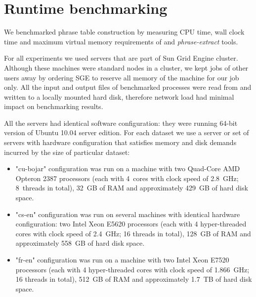 \section{Runtime benchmarking}

We benchmarked phrase table construction by measuring CPU time, wall clock time
and maximum virtual memory requirements of \eppex{} and \emph{phrase-extract} tools.

For all experiments we used servers that are part of Sun Grid Engine cluster.
Although these machines were standard nodes in a cluster, we kept jobs of other
users away by ordering SGE to reserve all memory of the machine for our job only.
All the input and output files of benchmarked processes were read from and written
to a locally mounted hard disk, therefore network load had minimal impact on
benchmarking results.

All the servers had identical software configuration:
they were running 64-bit version of Ubuntu 10.04 server edition.
For each dataset we use a server or set of servers with hardware configuration
that satisfies memory and disk demands incurred by the size of particular dataset:
\begin{itemize}
  \item "cu-bojar" configuration was run on a machine with two Quad-Core
  AMD Opteron\texttrademark{} 2387 processors (each with 4~cores with clock speed
  of 2.8~GHz; 8~threads in total),
  32~GB of RAM and approximately 429~GB of hard disk space. %
  \item "cs-en" configuration was run on several machines with identical hardware
  configuration: two Intel\textregistered{} Xeon\textregistered{} E5620
  processors
  (each with 4 hyper-threaded cores with clock speed of 2.4~GHz; 16 threads in total),
  128~GB of RAM and approximately 558~GB of hard disk space. %
  \item "fr-en" configuration was run on a machine with two Intel\textregistered{}
  Xeon\textregistered{} E7520
  processors
  (each with 4 hyper-threaded cores with clock speed of 1.866~GHz; 16 threads in total),
  512~GB of RAM and approximately 1.7~TB of hard disk space. %
\end{itemize}



